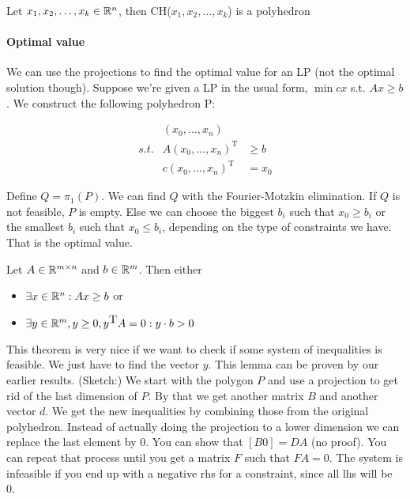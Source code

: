 \begin{cor} Let $x_1,x_2,\ldots, x_k \in \mathbb{R}^n$, then CH($x_1,x_2,\ldots, x_k$) is a polyhedron\end{cor}

\paragraph*{Optimal value} We can use the projections to find the optimal value for an LP (not the optimal solution though). Suppose we're given a LP in the usual form, $\min cx$ s.t. $Ax\geq b$. We construct the following polyhedron P:

\begin{eqnarray*}
 & (x_0,\ldots,x_n) & \\
s.t. & A(x_0,\ldots,x_n)^{\mbox{T}} & \geq b \\
& c(x_0,\ldots,x_n)^{\mbox{T}} & = x_0
\end{eqnarray*}

Define $Q = \pi_1(P)$. We can find $Q$ with the Fourier-Motzkin elimination. If $Q$ is not feasible, $P$ is empty. Else we can choose the biggest $b_i$ such that $x_0\geq b_i$ or the smallest $b_i$ such that $x_0 \leq b_i$, depending on the type of constraints we have. That is the optimal value.

\begin{thm} Let $A\in \mathbb{R}^{m\times n}$ and $b\in \mathbb{R}^m$. Then either 
\begin{itemize}
\item $\exists x\in \mathbb{R}^n: Ax\geq b$ or
\item $\exists y\in \mathbb{R}^m, y\geq 0, y^{\mbox{T}}A=0: y\cdot b>0$
\end{itemize}
\end{thm} 

This theorem is very nice if we want to check if some system of inequalities is feasible. We just have to find the vector $y$. This lemma can be proven by our earlier results. (Sketch:) We start with the polygon $P$ and use a projection to get rid of the last dimension of $P$. By that we get another matrix $B$ and another vector $d$. We get the new inequalities by combining those from the original polyhedron. Instead of actually doing the projection to a lower dimension we can replace the last element by 0. You can show that $[B0]=DA$ (no proof). You can repeat that process until you get a matrix $F$ such that $FA=0$. The system is infeasible if you end up with a negative rhs for a constraint, since all lhs will be 0.